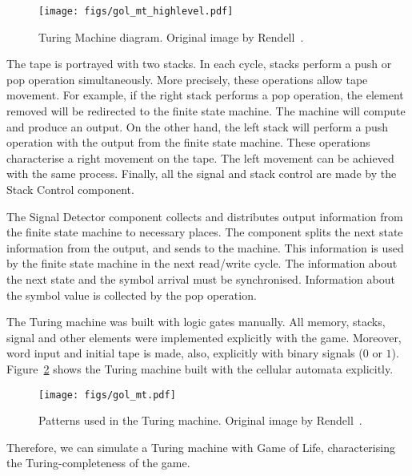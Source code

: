 \documentclass[12pt]{article}
\begin{document}
\begin{figure}[h]
    \centering
    \texttt{[image: figs/gol\_mt\_highlevel.pdf]}
    \caption{Turing Machine diagram. Original image by Rendell~\cite{Rendell:inproc:2011:jul}.}
    \label{fig:gol_mt_highlevel}
\end{figure}

The tape is portrayed with two stacks. In each cycle, stacks perform a push or pop operation simultaneously. More precisely, these operations allow tape movement. For example, if the right stack performs a pop operation, the element removed will be redirected to the finite state machine. The machine will compute and produce an output. On the other hand, the left stack will perform a push operation with the output from the finite state machine. These operations characterise a right movement on the tape. The left movement can be achieved with the same process. Finally, all the signal and stack control are made by the Stack Control component.

The Signal Detector component collects and distributes output information from the finite state machine to necessary places. The component splits the next state information from the output, and sends to the machine. This information is used by the finite state machine in the next read/write cycle. The information about the next state and the symbol arrival must be synchronised. Information about the symbol value is collected by the pop operation.

The Turing machine was built with logic gates manually. All memory, stacks, signal and other elements were implemented explicitly with the game. Moreover, word input and initial tape is made, also, explicitly with binary signals ($0$ or $1$). Figure~\ref{fig:gol_mt} shows the Turing machine built with the cellular automata explicitly.

\begin{figure}[h]
    \centering
    \texttt{[image: figs/gol\_mt.pdf]}
    \caption{Patterns used in the Turing machine. Original image by Rendell~\cite{Rendell:inproc:2011:jul}.}
    \label{fig:gol_mt}
\end{figure}

Therefore, we can simulate a Turing machine with Game of Life, characterising the Turing-completeness of the game.
\end{document}
